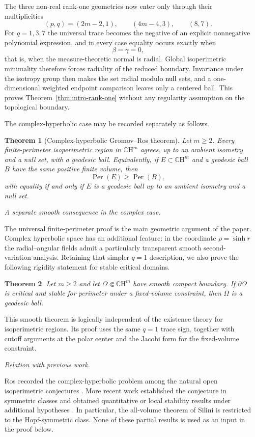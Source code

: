 \documentclass[11pt,reqno]{amsart}
\numberwithin{equation}{section}
\newtheorem{theorem}{Theorem}[section]
\theoremstyle{definition}
\theoremstyle{remark}
\newcommand{\CH}{\mathbb{C}\mathrm{H}}
\newcommand{\Per}{\operatorname{Per}}
\newcommand{\ithead}[1]{%
  \par\medskip\noindent\textit{#1}\enspace
}
\begin{document}
The three non-real rank-one geometries now enter only through their
multiplicities
\[
 (p,q)=(2m-2,1),\qquad (4m-4,3),\qquad (8,7).
\]
For $q=1,3,7$ the universal trace becomes the negative of an explicit
nonnegative polynomial expression, and in every case equality occurs exactly
when
\[
 \beta=\gamma=0,
\]
that is, when the measure-theoretic normal is radial.  Global isoperimetric
minimality therefore forces radiality of the reduced boundary.  Invariance
under the isotropy group then makes the set radial modulo null sets, and a
one-dimensional weighted endpoint comparison leaves only a centered ball.
This proves Theorem~\ref{thm:intro-rank-one} without any regularity assumption
on the topological boundary.

The complex-hyperbolic case may be recorded separately as follows.

\begin{theorem}[Complex-hyperbolic Gromov--Ros theorem]
\label{thm:intro-gromov-ros}
Let $m\ge2$.  Every finite-perimeter isoperimetric region in $\CH^m$ agrees,
up to an ambient isometry and a null set, with a geodesic ball.  Equivalently,
if $E\subset\CH^m$ and a geodesic ball $B$ have the same positive finite
volume, then
\[
 \Per(E)\ge\Per(B),
\]
with equality if and only if $E$ is a geodesic ball up to an ambient isometry
and a null set.
\end{theorem}

\ithead{A separate smooth consequence in the complex case.}
The universal finite-perimeter proof is the main geometric argument of the
paper.  Complex hyperbolic space has an additional feature: in the coordinate
$\rho=\sinh r$ the radial--angular fields admit a particularly transparent
smooth second-variation analysis.  Retaining that simpler $q=1$ description,
we also prove the following rigidity statement for stable critical domains.

\begin{theorem}\label{thm:intro-main}
Let $m\ge2$ and let $\Omega\Subset\CH^m$ have smooth compact boundary.  If
$\partial\Omega$ is critical and stable for perimeter under a fixed-volume
constraint, then $\Omega$ is a geodesic ball.
\end{theorem}

This smooth theorem is logically independent of the existence theory for
isoperimetric regions.  Its proof uses the same $q=1$ trace sign, together
with cutoff arguments at the polar center and the Jacobi form for the
fixed-volume constraint.

\ithead{Relation with previous work.}
Ros recorded the complex-hyperbolic problem among the natural open
isoperimetric conjectures \cite[p.~2]{Ros2005}.  More recent work established
the conjecture in symmetric classes and obtained quantitative or local
stability results under additional hypotheses
\cite{Silini2024,Silini2025,Kalaj2026}.  In particular, the all-volume theorem
of Silini \cite[Corollary~1.6]{Silini2024} is restricted to the
Hopf-symmetric class.  None of these partial results is used as an input in
the proof below.
\end{document}
